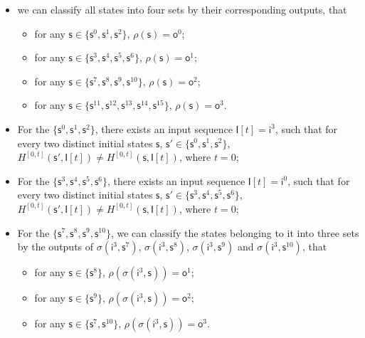 \begin{itemize}
  \item we can classify all states into four sets by their corresponding outputs, that 
  \begin{itemize}
   \item for any $\mathsf{s}\in\{\mathsf{s}^0,\mathsf{s}^1,\mathsf{s}^2\}$, $\rho(\mathsf{s})=\mathsf{o}^0$;
   \item for any $\mathsf{s}\in\{\mathsf{s}^3,\mathsf{s}^4,\mathsf{s}^5,\mathsf{s}^6\}$,  $\rho(\mathsf{s})=\mathsf{o}^1$;
   \item for any $\mathsf{s}\in\{\mathsf{s}^7,\mathsf{s}^8,\mathsf{s}^9,\mathsf{s}^{10}\}$,  $\rho(\mathsf{s})=\mathsf{o}^2$;
   \item for any $\mathsf{s}\in\{\mathsf{s}^{11},\mathsf{s}^{12},\mathsf{s}^{13},\mathsf{s}^{14},\mathsf{s}^{15}\}$, $\rho(\mathsf{s})=\mathsf{o}^3$.
  \end{itemize} 
    
  \item For the $\{\mathsf{s}^0,\mathsf{s}^1,\mathsf{s}^2\}$, there exists an input sequence $\mathsf{I}[t]=\mathsf{i}^3$, such that for every two distinct initial states $\mathsf{s}$, $\mathsf{s}'\in \{\mathsf{s}^0,\mathsf{s}^1,\mathsf{s}^2\}$,  $H^{[0,t]}(\mathsf{s}',\mathsf{I}[t])\neq H^{[0,t]}(\mathsf{s}, \mathsf{I}[t])$, where $t=0$;
  \item For the  $\{\mathsf{s}^3,\mathsf{s}^4,\mathsf{s}^5, \mathsf{s}^6\}$, there exists an input sequence $\mathsf{I}[t]=\mathsf{i}^0$, such that for every two distinct initial states $\mathsf{s}$, $\mathsf{s}'\in \{\mathsf{s}^3,\mathsf{s}^4,\mathsf{s}^5, \mathsf{s}^6\}$,  $H^{[0,t]}(\mathsf{s}',\mathsf{I}[t])\neq H^{[0,t]}(\mathsf{s}, \mathsf{I}[t])$, where $t=0$;  
  \item For the $\{\mathsf{s}^7,\mathsf{s}^8,\mathsf{s}^9,\mathsf{s}^{10}\}$, we can classify the states belonging to it into three sets by the outputs of  $\sigma (\mathsf{i}^3, \mathsf{s}^7)$, $\sigma (\mathsf{i}^3,\mathsf{s}^8)$, $\sigma (\mathsf{i}^3, \mathsf{s}^9)$ and $\sigma (\mathsf{i}^3, \mathsf{s}^{10})$, that  
   \begin{itemize}
   \item  for any $\mathsf{s}\in\{\mathsf{s}^8\}$, $\rho(\sigma (\mathsf{i}^3,\mathsf{s}))=\mathsf{o}^1$;
   \item  for any $\mathsf{s}\in\{\mathsf{s}^9\}$, $\rho(\sigma (\mathsf{i}^3,\mathsf{s}))=\mathsf{o}^2$;
   \item  for any $\mathsf{s}\in\{\mathsf{s}^7,\mathsf{s}^{10}\}$, $\rho(\sigma (\mathsf{i}^3,\mathsf{s}))=\mathsf{o}^3$.
   \end{itemize} 


\end{itemize}
